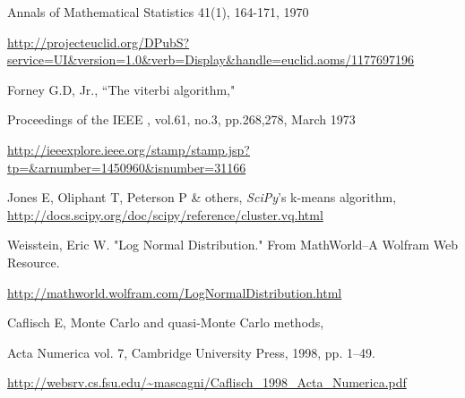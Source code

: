 \documentclass{report}
\begin{document}
\begin{thebibliography}{9}
Annals of Mathematical Statistics 41(1), 164-171, 1970

\url{http://projecteuclid.org/DPubS?service=UI&version=1.0&verb=Display&handle=euclid.aoms/1177697196}

 Forney G.D, Jr., ``The viterbi algorithm,"

Proceedings of the IEEE , vol.61, no.3, pp.268,278, March 1973

\url{http://ieeexplore.ieee.org/stamp/stamp.jsp?tp=&arnumber=1450960&isnumber=31166}

 Jones E, Oliphant T, Peterson P \& others, \emph{SciPy}'s k-means algorithm, \url{http://docs.scipy.org/doc/scipy/reference/cluster.vq.html}

 Weisstein, Eric W. "Log Normal Distribution." From MathWorld--A Wolfram Web Resource.

\url{http://mathworld.wolfram.com/LogNormalDistribution.html}

 Caflisch E, Monte Carlo and quasi-Monte Carlo methods,

Acta Numerica vol. 7, Cambridge University Press, 1998, pp. 1–49.

\url{http://websrv.cs.fsu.edu/~mascagni/Caflisch_1998_Acta_Numerica.pdf}

\end{thebibliography}
\end{document}
